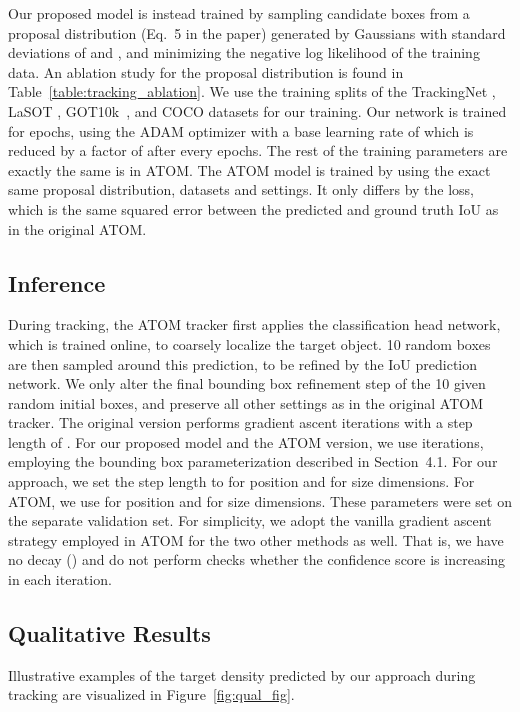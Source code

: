 \documentclass[runningheads]{llncs}
\begin{document}
\begin{appendices}
Our proposed model is instead trained by sampling  candidate boxes from a proposal distribution (Eq.~5 in the paper) generated by  Gaussians with standard deviations of  and , and minimizing the negative log likelihood of the training data. An ablation study for the proposal distribution is found in Table~\ref{table:tracking_ablation}. We use the training splits of the TrackingNet \cite{TrackingNet}, LaSOT \cite{fan2019lasot}, GOT10k~\cite{huang2019got}, and COCO datasets for our training. Our network is trained for  epochs, using the ADAM optimizer with a base learning rate of  which is reduced by a factor of  after every  epochs. The rest of the training parameters are exactly the same is in ATOM. The ATOM model is trained by using the exact same proposal distribution, datasets and settings. It only differs by the loss, which is the same squared error between the predicted and ground truth IoU as in the original ATOM.

\subsection{Inference}
During tracking, the ATOM tracker first applies the classification head network, which is trained online, to coarsely localize the target object. 10 random boxes are then sampled around this prediction, to be refined by the IoU prediction network. We only alter the final bounding box refinement step of the 10 given random initial boxes, and preserve all other settings as in the original ATOM tracker. The original version performs  gradient ascent iterations with a step length of . For our proposed model and the ATOM version, we use  iterations, employing the bounding box parameterization described in Section~4.1. For our approach, we set the step length to  for position and  for size dimensions. For ATOM, we use  for position and  for size dimensions. These parameters were set on the separate validation set. For simplicity, we adopt the vanilla gradient ascent strategy employed in ATOM for the two other methods as well. That is, we have no decay () and do not perform checks whether the confidence score is increasing in each iteration.

\subsection{Qualitative Results}

Illustrative examples of the target density  predicted by our approach during tracking are visualized in Figure~\ref{fig:qual_fig}.




\end{appendices}
\end{document}
